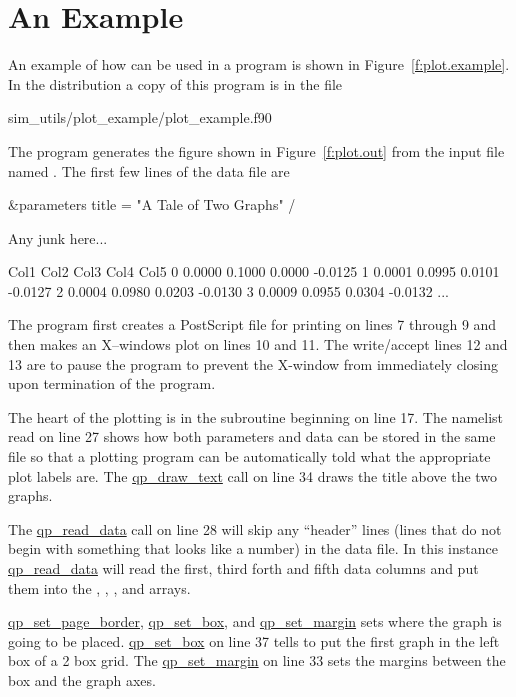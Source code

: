 \section{An Example}
\label{s:plot.example}

An example of how \quickplot can be used in a program is shown in
Figure~\ref{f:plot.example}. In the \bmad distribution a copy of this
program is in the file
\begin{example}
  sim_utils/plot_example/plot_example.f90
\end{example}
The  program generates the figure shown in
Figure~\ref{f:plot.out} from the input file named . The
first few lines of the data file are
\begin{example}
  \&parameters
    title = "A Tale of Two Graphs"
  /
 
  Any junk here...
 
  Col1      Col2      Col3      Col4      Col5
     0    0.0000    0.1000    0.0000   -0.0125
     1    0.0001    0.0995    0.0101   -0.0127
     2    0.0004    0.0980    0.0203   -0.0130
     3    0.0009    0.0955    0.0304   -0.0132
     ...
\end{example}

The program first creates a PostScript file for printing on lines 7
through 9 and then makes an X--windows plot on lines 10 and 11. The
write/accept lines 12 and 13 are to pause the program to prevent the
X-window from immediately closing upon termination of the program.

The heart of the plotting is in the subroutine  beginning
on line 17. The namelist read on line 27 shows how both parameters and
data can be stored in the same file so that a plotting program can be
automatically told what the appropriate plot labels are. The
\hyperref[r:qp.draw.text]{qp_draw_text} call on line 34 draws the 
title above the two graphs.

The \hyperref[r:qp.read.data]{qp_read_data} call on line 28 will skip
any ``header'' lines (lines that do not begin with something that looks
like a number) in the data file. In this instance
\hyperref[r:qp.read.data]{qp_read_data} will read the first, third forth
and fifth data columns and put them into the , , , and
 arrays.

\hyperref[r:qp.set.page.border]{qp_set_page_border}, 
\hyperref[r:qp.set.box]{qp_set_box}, and \hyperref[r:qp.set.margin]{qp_set_margin}
sets where the graph is going to be placed.  \hyperref[r:qp.set.box]{qp_set_box} on line 37 tells \quickplot to put the first graph in the
left box of a 2 box grid. The \hyperref[r:qp.set.margin]{qp_set_margin} on line 33 sets the
margins between the box and the graph axes.


